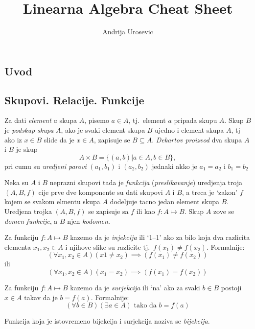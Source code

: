 \documentclass[12p,a4paper]{article}
\title{Linearna Algebra Cheat Sheet}
\author{Andrija Urosevic}
\begin{document}
\maketitle

\begin{multicols}{2}

\section{Uvod}

\subsection{Skupovi. Relacije. Funkcije}

    Za dati \textit{element} $a$ skupa $A$, pisemo $a \in A$, tj.\ element 
    $a$ pripada skupu $A$.
    Skup $B$ je \textit{podskup skupa} $A$, ako je svaki element skupa $B$ 
    ujedno i element skupa $A$, tj ako iz $x \in B$ slide da je $x \in A$, 
    zapisuje se $B \subseteq A$.
    \textit{Dekartov proizvod} dva skupa $A$ i $B$ je skup
    \[A \times B = \{(a, b) | a \in A, b \in B\},\]
    pri cumu su \textit{uredjeni parovi} $(a_1, b_1)$ i $(a_2, b_2)$ jednaki 
    akko je $a_1 = a_2$ i $b_1 = b_2$

    Neka su $A$ i $B$ neprazni skupovi tada je \textit{funkcija} 
    (\textit{preslikavanje}) uredjenja troja $(A, B, f)$ cije prve dve 
    komponente su dati skupovi $A$ i $B$, a treca je `zakon' $f$ kojem se 
    svakom elmentu skupa $A$ dodeljuje tacno jedan element skupa $B$. Uredjena 
    trojka $(A, B, f)$ se zapisuje sa $f$ ili kao $f:A \mapsto B$.
    Skup $A$ zove se \textit{domen funkcije}, a $B$ njen \textit{kodomen}.

    Za funkciju $f : A \mapsto B$ kazemo da je \textit{injekcija} ili `1--1' 
    ako za bilo koja dva razlicita elementa $x_1, x_2 \in A$ i njihove slike 
    su razlicite tj.\ $f(x_1) \neq f(x_2)$. Formalnije:
    \[(\forall x_1, x_2 \in A) (x1 \neq x_2) \implies (f(x_1) \neq f(x_2))\]
    ili
    \[(\forall x_1, x_2 \in A) (x_1 = x_2) \implies (f(x_1) = f(x_2))\]

    Za funkciju $f : A \mapsto B$ kazemo da je \textit{surjekcija} ili `na' 
    ako za svaki $b \in B$ postoji $x \in A$ takav da je $b = f(a)$. 
    Formalnije:
    \[(\forall b \in B) (\exists a \in A)\text{ tako da } b = f(a)\]

    Funkcija koja je istovremeno bijekcija i surjekcija naziva se 
    \textit{bijekcija}.


\end{multicols}
\end{document}
